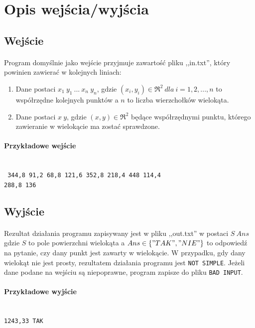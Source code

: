 \documentclass{article}
\begin{document}
\section{Opis wejścia/wyjścia}

\subsection{Wejście}

\paragraph{}
Program domyślnie jako wejście przyjmuje zawartość pliku ,,in.txt'', który powinien zawierać w kolejnych liniach:
\begin{enumerate}
\item Dane postaci \(x_1\ y_1\ ...\ x_n\ y_n\), gdzie \((x_i,y_i) \in \Re^{2} \ dla\ i=1,2,...,n\) to współrzędne kolejnych punktów a \(n\) to liczba wierzchołków wielokąta.
\item Dane postaci \(x\ y\), gdzie \((x,y) \in \Re^{2}\) będące współrzędnymi punktu, którego zawieranie w wielokącie ma zostać sprawdzone.
\end{enumerate}

\paragraph{Przykładowe wejście} \mbox{}\\
\texttt{
344,8 91,2 68,8 121,6 352,8 218,4 448 114,4\\
288,8 136
}

\subsection{Wyjście}

\paragraph{}
Rezultat działania programu zapisywany jest w pliku ,,out.txt'' w postaci \(S\ Ans\) gdzie \(S\) to pole powierzchni wielokąta a \(Ans\in\{"TAK","NIE"\}\) to odpowiedź na pytanie, czy dany punkt jest zawarty w wielokącie. W przypadku, gdy dany wielokąt nie jest prosty, rezultatem działania programu jest \texttt{NOT SIMPLE}. Jeżeli dane podane na wejściu są niepoprawne, program zapisze do pliku \texttt{BAD INPUT}.

\paragraph{Przykładowe wyjście} \mbox{}\\
\texttt{1243,33 TAK}
\end{document}
